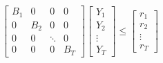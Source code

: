 \documentclass[11pt]{article} %
\begin{document}
\begin{align} 
    \begin{bmatrix}
        B_1 & 0 & 0 & 0\\
        0 & B_2 & 0 & 0\\
        0 & 0 & \ddots  & 0\\
        0 & 0 & 0 & B_T
    \end{bmatrix} 
    \begin{bmatrix}
        Y_1\\
        Y_2\\
        \vdots \\
        Y_T
    \end{bmatrix} \leq
    \begin{bmatrix}
        r_1\\
        r_2\\
        \vdots \\
        r_T
    \end{bmatrix}
\end{align}
\end{document}
